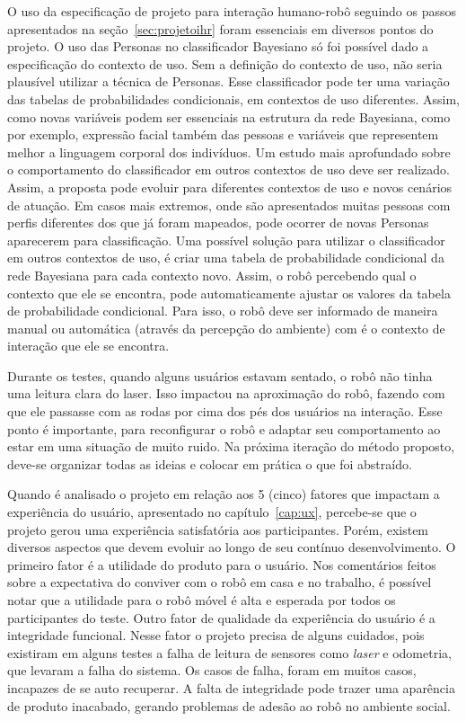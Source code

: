 O uso da especificação de projeto para interação humano-robô seguindo os passos apresentados na seção~\ref{sec:projetoihr} foram essenciais em diversos pontos do projeto. O uso das Personas no classificador Bayesiano só foi possível dado a especificação do contexto de uso. Sem a definição do contexto de uso, não seria plausível utilizar a técnica de Personas. Esse classificador pode ter uma variação das tabelas de probabilidades condicionais, em contextos de uso diferentes. Assim, como novas variáveis podem ser essenciais na estrutura da rede Bayesiana, como por exemplo, expressão facial também das pessoas e variáveis que representem melhor a linguagem corporal dos indivíduos. Um estudo mais aprofundado sobre o comportamento do classificador em outros contextos de uso deve ser realizado. Assim, a proposta pode evoluir para diferentes contextos de uso e novos cenários de atuação. Em casos mais extremos, onde são apresentados muitas pessoas com perfis diferentes dos que já foram mapeados, pode ocorrer de novas Personas aparecerem para classificação. Uma possível solução para utilizar o classificador em outros contextos de uso, é criar uma tabela de probabilidade condicional da rede Bayesiana para cada contexto novo. Assim, o robô percebendo qual o contexto que ele se encontra, pode automaticamente ajustar os valores da tabela de probabilidade condicional. Para isso, o robô deve ser informado de maneira manual ou automática (através da percepção do ambiente) com é o contexto de interação que ele se encontra.

Durante os testes, quando alguns usuários estavam sentado, o robô não tinha uma leitura clara do laser. Isso impactou na aproximação do robô, fazendo com que ele passasse com as rodas por cima dos pés dos usuários na interação. Esse ponto é importante, para reconfigurar o robô e adaptar seu comportamento ao estar em uma situação de muito ruido. Na próxima iteração do método proposto, deve-se organizar todas as ideias e colocar em prática o que foi abstraído.

Quando é analisado o projeto em relação aos 5 (cinco) fatores que impactam a experiência do usuário, apresentado no capítulo~\ref{cap:ux}, percebe-se que o projeto gerou uma experiência satisfatória aos participantes. Porém, existem diversos aspectos que devem evoluir ao longo de seu contínuo desenvolvimento. O primeiro fator é a utilidade do produto para o usuário. Nos comentários feitos sobre a expectativa do conviver com o robô em casa e no trabalho, é possível notar que a utilidade para o robô móvel é alta e esperada por todos os participantes do teste. Outro fator de qualidade da experiência do usuário é a integridade funcional. Nesse fator o projeto precisa de alguns cuidados, pois existiram em alguns testes a falha de leitura de sensores como \emph{laser} e odometria, que levaram a falha do sistema. Os casos de falha, foram em muitos casos, incapazes de se auto recuperar. A falta de integridade pode trazer uma aparência de produto inacabado, gerando problemas de adesão ao robô no ambiente social.

